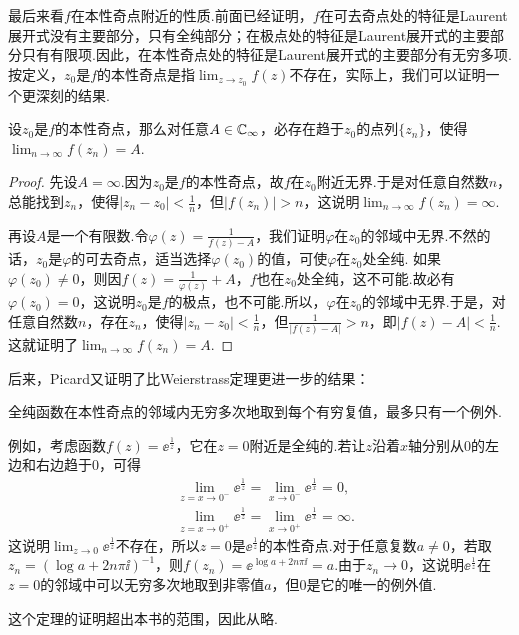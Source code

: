 最后来看$f$在本性奇点附近的性质.前面已经证明，$f$在可去奇点处的特征是Laurent展开式没有主要部分，只有全纯部分；在极点处的特征是Laurent展开式的主要部分只有有限项.因此，在本性奇点处的特征是Laurent展开式的主要部分有无穷多项.按定义，$z_0$是$f$的本性奇点是指$\lim_{z\to z_0}f(z)$不存在，实际上，我们可以证明一个更深刻的结果.
\begin{theorem}\label{thm5.2.5}
  设$z_0$是$f$的本性奇点，那么对任意$A\in\mathbb C_\infty$，必存在趋于$z_0$的点列$\{z_n\}$，使得$\lim_{n\to\infty}f(z_n)=A$.
\end{theorem}
\begin{proof}
  先设$A=\infty$.因为$z_0$是$f$的本性奇点，故$f$在$z_0$附近无界.于是对任意自然数$n$，总能找到$z_n$，使得$|z_n-z_0|<\frac1n$，但$|f(z_n)|>n$，这说明$\lim_{n\to\infty}f(z_n)=\infty$.

  再设$A$是一个有限数.令$\varphi(z)=\frac1{f(z)-A}$，我们证明$\varphi$在$z_0$的邻域中无界.不然的话，$z_0$是$\varphi$的可去奇点，适当选择$\varphi(z_0)$的值，可使$\varphi$在$z_0$处全纯. 如果$\varphi(z_0)\ne0$，则因$f(z)=\frac1{\varphi(z)}+A$，$f$也在$z_0$处全纯，这不可能.故必有$\varphi(z_0)=0$，这说明$z_0$是$f$的极点，也不可能.所以，$\varphi$在$z_0$的邻域中无界.于是，对任意自然数$n$，存在$z_n$，使得$|z_n-z_0|<\frac1n$，但$\frac1{|f(z)-A|}>n$，即$|f(z)-A|<\frac1n$.这就证明了$\lim_{n\to\infty}f(z_n)=A$.
\end{proof}

后来，Picard又证明了比Weierstrass定理更进一步的结果：
\begin{theorem}\label{thm5.2.6}
  全纯函数在本性奇点的邻域内无穷多次地取到每个有穷复值，最多只有一个例外.
\end{theorem}

例如，考虑函数$f(z)=\ee^{\frac1z}$，它在$z=0$附近是全纯的.若让$z$沿着$x$轴分别从$0$的左边和右边趋于$0$，可得
\begin{align*}
  & \lim_{z=x\to0^-}\ee^{\frac1z} = \lim_{x\to0^-}\ee^{\frac1x} = 0,\\
  & \lim_{z=x\to0^+}\ee^{\frac1z} = \lim_{x\to0^+}\ee^{\frac1x} = \infty.
\end{align*}
这说明$\lim_{z\to0}\ee^{\frac1z}$不存在，所以$z=0$是$\ee^{\frac1z}$的本性奇点.对于任意复数$a\ne0$，若取$z_n=(\log a+2n\pi\ii)^{-1}$，则$f(z_n)=\ee^{\log a+2n\pi\ii}=a$.由于$z_n\to0$，这说明$\ee^{\frac1z}$在$z=0$的邻域中可以无穷多次地取到非零值$a$，但$0$是它的唯一的例外值.

这个定理的证明超出本书的范围，因此从略.

